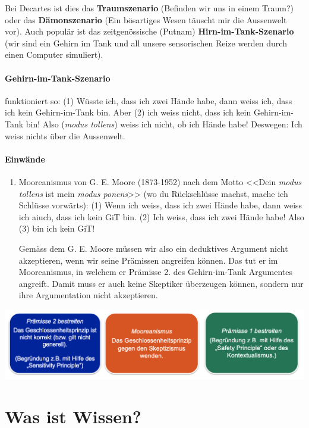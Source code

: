 \documentclass[../main.tex]{subfiles}
\begin{document}
Bei Decartes ist dies das \textbf{Traumszenario} (Befinden wir uns in einem Traum?) oder das \textbf{Dämonszenario} (Ein bösartiges Wesen täuscht mir die Aussenwelt vor). Auch populär ist das zeitgenössische (Putnam) \textbf{Hirn-im-Tank-Szenario} (wir sind ein Gehirn im Tank und all unsere sensorischen Reize werden durch einen Computer simuliert).

\paragraph{Gehirn-im-Tank-Szenario} funktioniert so: (1) Wüsste ich, dass ich zwei Hände habe, dann weiss ich, dass ich kein Gehirn-im-Tank bin. Aber (2) ich weiss nicht, dass ich kein Gehirn-im-Tank bin! Also (\textit{modus tollens}) weiss ich nicht, ob ich Hände habe! Deswegen: Ich weiss nichts über die Aussenwelt.

\paragraph{Einwände}
\begin{enumerate}
	\item Mooreanismus von G. E. Moore (1873-1952) nach dem Motto <<Dein \textit{modus tollens} ist mein \textit{modus ponens}>> (wo du Rückschlüsse machst, mache ich Schlüsse vorwärts): (1) Wenn ich weiss, dass ich zwei Hände habe, dann weiss ich aiuch, dass ich kein GiT bin. (2) Ich weiss, dass ich zwei Hände habe! Also (3) bin ich kein GiT!

		Gemäss dem G. E. Moore müssen wir also ein deduktives Argument nicht akzeptieren, wenn wir seine Prämissen angreifen können. Das tut er im Mooreanismus, in welchem er Prämisse 2. des Gehirn-im-Tank Argumentes angreift. Damit muss er auch keine Skeptiker überzeugen können, sondern nur ihre Argumentation nicht akzeptieren. 
\end{enumerate}
\vspace{10pt}
{\centering\includegraphics[width=\textwidth]{images/loesungsansaetze_gehirn_im_tank.png}\endcenter}


\section{Was ist Wissen?}
\end{document}
